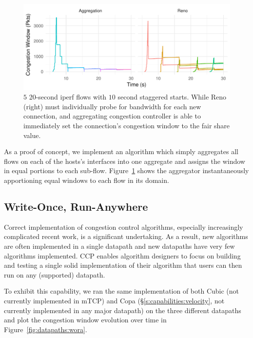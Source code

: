 \begin{figure}
    \centering
    \includegraphics[width=\columnwidth]{img/stair}
    \caption{$5$ 20-second iperf flows with $10$ second staggered starts. While Reno (right) must individually probe for bandwidth for each new connection, and aggregating congestion controller is able to immediately set the connection's congestion window to the fair share value.}
    \label{fig:cap:agg}
\end{figure}

As a proof of concept, we implement an algorithm which simply aggregates all flows on each of the hosts's interfaces into one aggregate and assigns the window in equal portions to each sub-flow.
Figure~\ref{fig:cap:agg} shows the aggregator instantaneously apportioning equal windows to each flow in its domain.

 
\subsection{Write-Once, Run-Anywhere}
\label{s:capabilities:wora}
\label{s:datapaths:eval}

Correct implementation of congestion control algorithms, especially increasingly complicated recent work, is a significant undertaking.
As a result, new algorithms are often implemented in a single datapath and new datapaths have very few algorithms implemented. 
CCP enables algorithm designers to focus on building and testing a single solid implementation of their algorithm that users can then run on any (supported) datapath. 


To exhibit this capability, we ran the same implementation of both Cubic (not currently implemented in mTCP) and Copa (\S\ref{s:capabilities:velocity}, not currently implemented in any major datapath) on the three different datapaths and plot the congestion window evolution over time in Figure~\ref{fig:datapaths:wora}.

